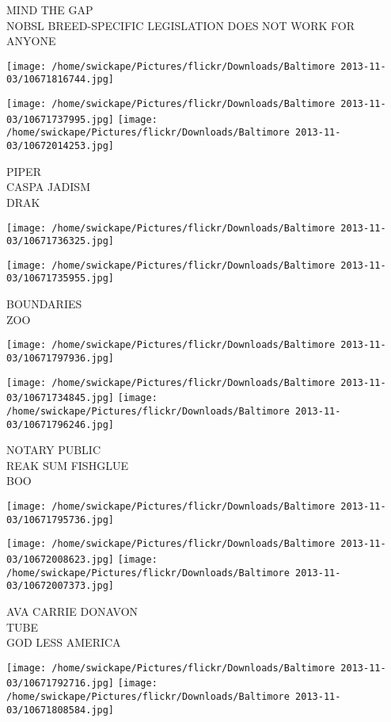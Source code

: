 \documentclass[10pt,letterpaper]{article}
\begin{document}
MIND THE GAP\\
NOBSL BREED{-}SPECIFIC LEGISLATION DOES NOT WORK FOR ANYONE
\pagebreak

\texttt{[image: /home/swickape/Pictures/flickr/Downloads/Baltimore 2013-11-03/10671816744.jpg]}

\vspace{0.25in}
\texttt{[image: /home/swickape/Pictures/flickr/Downloads/Baltimore 2013-11-03/10671737995.jpg]}
\texttt{[image: /home/swickape/Pictures/flickr/Downloads/Baltimore 2013-11-03/10672014253.jpg]}

PIPER\\
CASPA JADISM\\
DRAK
\pagebreak

\texttt{[image: /home/swickape/Pictures/flickr/Downloads/Baltimore 2013-11-03/10671736325.jpg]}

\vspace{0.25in}
\texttt{[image: /home/swickape/Pictures/flickr/Downloads/Baltimore 2013-11-03/10671735955.jpg]}

BOUNDARIES\\
ZOO
\pagebreak

\texttt{[image: /home/swickape/Pictures/flickr/Downloads/Baltimore 2013-11-03/10671797936.jpg]}

\vspace{0.25in}
\texttt{[image: /home/swickape/Pictures/flickr/Downloads/Baltimore 2013-11-03/10671734845.jpg]}
\texttt{[image: /home/swickape/Pictures/flickr/Downloads/Baltimore 2013-11-03/10671796246.jpg]}

NOTARY PUBLIC\\
REAK SUM FISHGLUE\\
BOO
\pagebreak

\texttt{[image: /home/swickape/Pictures/flickr/Downloads/Baltimore 2013-11-03/10671795736.jpg]}

\vspace{0.25in}
\texttt{[image: /home/swickape/Pictures/flickr/Downloads/Baltimore 2013-11-03/10672008623.jpg]}
\texttt{[image: /home/swickape/Pictures/flickr/Downloads/Baltimore 2013-11-03/10672007373.jpg]}

AVA CARRIE DONAVON\\
TUBE\\
GOD LESS AMERICA
\pagebreak

\texttt{[image: /home/swickape/Pictures/flickr/Downloads/Baltimore 2013-11-03/10671792716.jpg]}
\texttt{[image: /home/swickape/Pictures/flickr/Downloads/Baltimore 2013-11-03/10671808584.jpg]}
\end{document}
